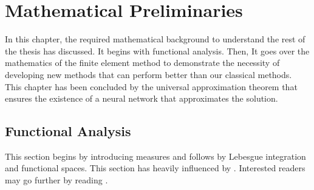 \chapter{Mathematical Preliminaries}
In this chapter, the required mathematical background to understand the rest of the thesis has discussed. It begins with functional analysis. Then, It goes over the mathematics of the finite element method to demonstrate the necessity of developing new methods that can perform better than our classical methods. This chapter has been concluded by the universal approximation theorem that ensures the existence of a neural network that approximates the solution. 

\section{Functional Analysis}
\label{sec:functional_analysis}
This section begins by introducing measures and follows by  Lebesgue integration and functional spaces. This section has heavily influenced by \cite{UQIntro_Sullivan}. Interested readers may go further by reading \cite{UQIntro_Sullivan, rudin1991functional}.
